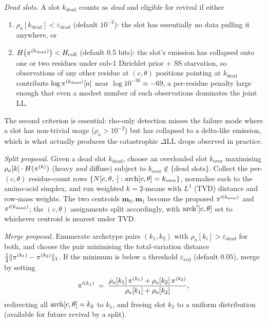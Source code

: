 \emph{Dead slots.} A slot $k_{\text{dead}}$ counts as \emph{dead} and
eligible for revival if either
\begin{enumerate}[label=(\alph*)]
  \item $\rho_a[k_{\text{dead}}] < \varepsilon_{\text{dead}}$ (default
    $10^{-2}$): the slot has essentially no data pulling it anywhere,
    or
  \item $H\bigl(\pi^{(k_{\text{dead}})}\bigr) < H_{\text{coll}}$
    (default $0.5$ bits): the slot's emission has collapsed onto one
    or two residues under sub-1 Dirichlet prior + SS starvation, so
    observations of any other residue at $(c, \theta)$ positions
    pointing at $k_{\text{dead}}$ contribute
    $\log \pi^{(k_{\text{dead}})}[a]$ near $\log 10^{-30} \approx -69$,
    a per-residue penalty large enough that even a modest number of
    such observations dominates the joint LL.
\end{enumerate}
The second criterion is essential: rho-only detection misses the
failure mode where a slot has non-trivial usage ($\rho_a > 10^{-2}$)
but has collapsed to a delta-like emission, which is what actually
produces the catastrophic $\Delta \text{LL}$ drops observed in practice.

\emph{Split proposal.} Given a dead slot $k_{\text{dead}}$, choose an
overloaded slot $k_{\text{over}}$ maximising $\rho_a[k]\cdot H(\pi^{(k)})$
(heavy \emph{and} diffuse) subject to $k_{\text{over}} \notin
\{\text{dead slots}\}$. Collect the per-$(c, \theta)$ residue-count rows
$\{N[c, \theta, \cdot] : \mathrm{arch}[c, \theta] = k_{\text{over}}\}$,
normalise each to the amino-acid simplex, and run weighted
$k=2$-means with $L^1$ (TVD) distance and row-mass weights. The two
centroids $\mathbf{m}_0, \mathbf{m}_1$ become the proposed
$\pi'^{(k_{\text{over}})}$ and $\pi'^{(k_{\text{dead}})}$; the
$(c, \theta)$ assignments split accordingly, with $\mathrm{arch}'[c, \theta]$
set to whichever centroid is nearest under TVD.

\emph{Merge proposal.} Enumerate archetype pairs $(k_1, k_2)$ with
$\rho_a[k_i] > \varepsilon_{\text{dead}}$ for both, and choose the pair
minimising the total-variation distance
$\tfrac{1}{2}\|\pi^{(k_1)} - \pi^{(k_2)}\|_1$. If the minimum is
below a threshold $\varepsilon_{\text{tvd}}$ (default $0.05$), merge by
setting
\[
  \pi'^{(k_1)} \;=\;
  \frac{\rho_a[k_1]\,\pi^{(k_1)} + \rho_a[k_2]\,\pi^{(k_2)}}
       {\rho_a[k_1] + \rho_a[k_2]},
\]
redirecting all $\mathrm{arch}[c, \theta] = k_2$ to $k_1$, and freeing slot
$k_2$ to a uniform distribution (available for future revival by a
split).

